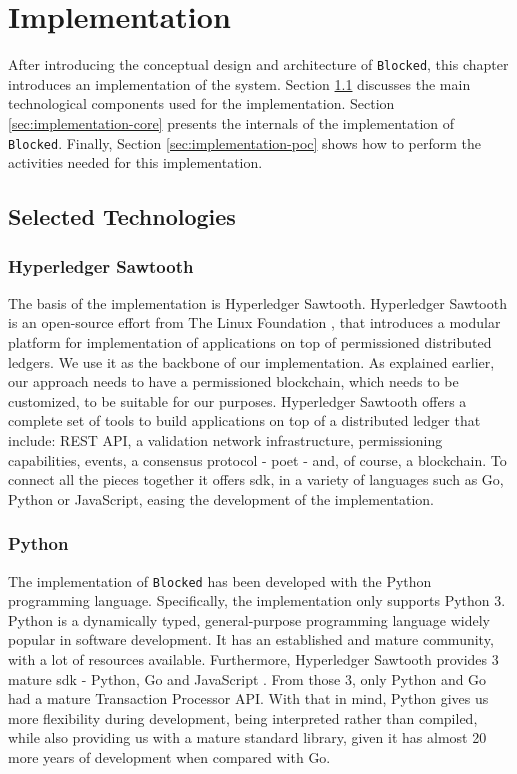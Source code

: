 \chapter{Implementation}
\label{chap:implementation}

After introducing the conceptual design and architecture of \texttt{Blocked}, this chapter introduces an implementation of the system. Section \ref{sec:implementation-technology} discusses the main technological components used for the implementation. Section \ref{sec:implementation-core} presents the internals of the implementation of \texttt{Blocked}. Finally, Section \ref{sec:implementation-poc} shows how to perform the activities needed for this implementation.

\section{Selected Technologies}
\label{sec:implementation-technology}

\subsection{Hyperledger Sawtooth}

The basis of the implementation is Hyperledger Sawtooth. Hyperledger Sawtooth is an open-source effort from The Linux Foundation \cite{linuxfoundation}, that introduces a modular platform for implementation of applications on top of permissioned distributed ledgers. We use it as the backbone of our implementation. As explained earlier, our approach needs to have a permissioned blockchain, which needs to be customized, to be suitable for our purposes. Hyperledger Sawtooth offers a complete set of tools to build applications on top of a distributed ledger that include: REST API, a validation network infrastructure, permissioning capabilities, events, a consensus protocol - \gls{poet} \cite{intel_poet} - and, of course, a blockchain. To connect all the pieces together it offers \gls{sdk}, in a variety of languages such as Go, Python or JavaScript, easing the development of the implementation.

\subsection{Python}

The implementation of \texttt{Blocked} has been developed with the Python \cite{python} programming language. Specifically, the implementation only supports Python 3. Python is a dynamically typed, general-purpose programming language widely popular in software development. It has an established and mature community, with a lot of resources available. Furthermore, Hyperledger Sawtooth provides 3 mature \gls{sdk} - Python, Go \cite{golang} and JavaScript \cite{nodejs}. From those 3, only Python and Go had a mature Transaction Processor API. With that in mind, Python gives us more flexibility during development, being interpreted rather than compiled, while also providing us with a mature standard library, given it has almost 20 more years of development when compared with Go.

